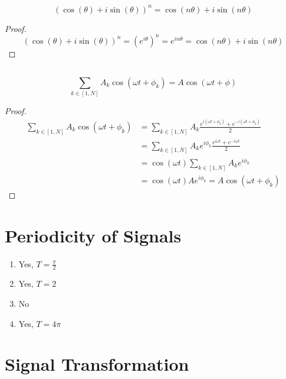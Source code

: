 \documentclass{article}
\begin{document}
\begin{theorem}
    \begin{equation}
        (\cos(\theta) + i \sin(\theta))^n = \cos(n \theta) + i \sin(n \theta)
    \end{equation}
\end{theorem}
\begin{proof}
    \begin{equation} 
        (\cos(\theta) + i \sin(\theta))^n = (e^{i \theta})^n = e^{i n \theta} = \cos(n \theta) + i \sin(n \theta)
    \end{equation}
\end{proof}

\subsection{}

\begin{theorem}
    \begin{equation}
        \sum_{k \in [1, N]} A_k \cos(\omega t + \phi_k) = A \cos(\omega t + \phi)
    \end{equation}
\end{theorem}
\begin{proof}
    \begin{align}
        \sum_{k \in [1, N]} A_k \cos(\omega t + \phi_k) &= \sum_{k \in [1, N]} A_k \frac{e^{i (\omega t + \phi_k)} + e^{-i (\omega t + \phi_k)}}{2} \\
        &= \sum_{k \in [1, N]} A_k e^{i \phi_k} \frac{e^{i \omega t} + e^{-i \omega t}}{2} \\
        &= \cos(\omega t) \sum_{k \in [1, N]} A_k e^{i \phi_k} \\
        &= \cos(\omega t) A e^{i \phi_k} = A \cos(\omega t + \phi_k)
    \end{align}
\end{proof}

\section{Periodicity of Signals}

\begin{enumerate}
    \item Yes, \(T = \frac{\pi}{2}\)
    \item Yes, \(T = 2\)
    \item No
    \item Yes, \(T = 4 \pi\)
\end{enumerate}

\section{Signal Transformation}
\end{document}
